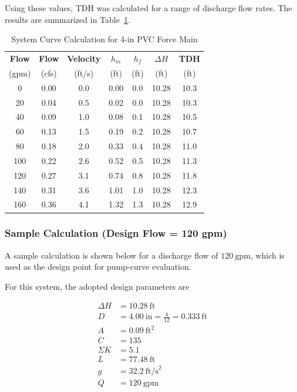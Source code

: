 Using these values, TDH was calculated for a range of discharge flow rates. The results are summarized in Table~\ref{tab:system_curve}.

\begin{table}[H]
\centering
\caption{System Curve Calculation for 4-in PVC Force Main}
\label{tab:system_curve}
\begin{tabular}{ccccccc}
\toprule
\textbf{Flow} & \textbf{Flow} & \textbf{Velocity} & \textbf{$h_m$} & \textbf{$h_f$} & \textbf{$\Delta H$} & \textbf{TDH} \\
(gpm) & (cfs) & (ft/s) & (ft) & (ft) & (ft) & (ft) \\
\midrule
0   & 0.00 & 0.0 & 0.00 & 0.0 & 10.28 & 10.3 \\
20  & 0.04 & 0.5 & 0.02 & 0.0 & 10.28 & 10.3 \\
40  & 0.09 & 1.0 & 0.08 & 0.1 & 10.28 & 10.5 \\
60  & 0.13 & 1.5 & 0.19 & 0.2 & 10.28 & 10.7 \\
80  & 0.18 & 2.0 & 0.33 & 0.4 & 10.28 & 11.0 \\
100 & 0.22 & 2.6 & 0.52 & 0.5 & 10.28 & 11.3 \\
120 & 0.27 & 3.1 & 0.74 & 0.8 & 10.28 & 11.8 \\
140 & 0.31 & 3.6 & 1.01 & 1.0 & 10.28 & 12.3 \\
160 & 0.36 & 4.1 & 1.32 & 1.3 & 10.28 & 12.9 \\
\bottomrule
\end{tabular}
\end{table}

\subsubsection*{Sample Calculation (Design Flow = 120 gpm)}

A sample calculation is shown below for a discharge flow of $120~\text{gpm}$, which is used as the design point for pump-curve evaluation.

For this system, the adopted design parameters are

\[
\begin{aligned}
\Delta H &= 10.28\ \text{ft} \\
D &= 4.00\ \text{in} = \frac{4}{12} = 0.333\ \text{ft} \\
A &= 0.09\ \text{ft}^2 \\
C &= 135 \\
\Sigma K &= 5.1 \\
L &= 77.48\ \text{ft} \\
g &= 32.2\ \text{ft/s}^2 \\
Q &= 120\ \text{gpm}
\end{aligned}
\]

